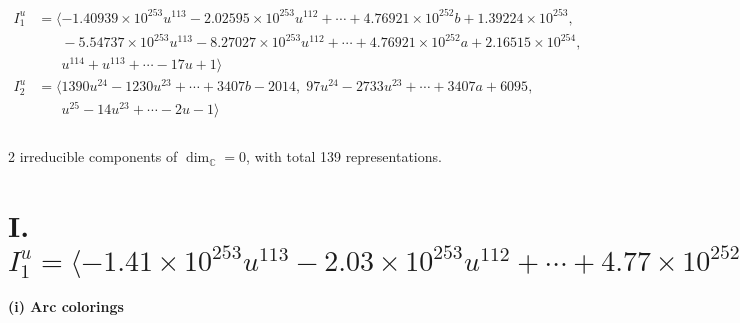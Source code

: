 \documentclass[1p]{elsarticle_modified}
\theoremstyle{definition}
\begin{document}
\begin{align*}
I^u_{1}&=\langle 
-1.40939\times10^{253} u^{113}-2.02595\times10^{253} u^{112}+\cdots+4.76921\times10^{252} b+1.39224\times10^{253},\\
\phantom{I^u_{1}}&\phantom{= \langle  }-5.54737\times10^{253} u^{113}-8.27027\times10^{253} u^{112}+\cdots+4.76921\times10^{252} a+2.16515\times10^{254},\\
\phantom{I^u_{1}}&\phantom{= \langle  }u^{114}+u^{113}+\cdots-17 u+1\rangle \\
I^u_{2}&=\langle 
1390 u^{24}-1230 u^{23}+\cdots+3407 b-2014,\;97 u^{24}-2733 u^{23}+\cdots+3407 a+6095,\\
\phantom{I^u_{2}}&\phantom{= \langle  }u^{25}-14 u^{23}+\cdots-2 u-1\rangle \\
\\
\end{align*}
\raggedright * 2 irreducible components of $\dim_{\mathbb{C}}=0$, with total 139 representations.\\
\newpage
\renewcommand{\arraystretch}{1}
\centering \section*{I. $I^u_{1}= \langle -1.41\times10^{253} u^{113}-2.03\times10^{253} u^{112}+\cdots+4.77\times10^{252} b+1.39\times10^{253},\;-5.55\times10^{253} u^{113}-8.27\times10^{253} u^{112}+\cdots+4.77\times10^{252} a+2.17\times10^{254},\;u^{114}+u^{113}+\cdots-17 u+1 \rangle$}
\flushleft \textbf{(i) Arc colorings}\\
\end{document}
